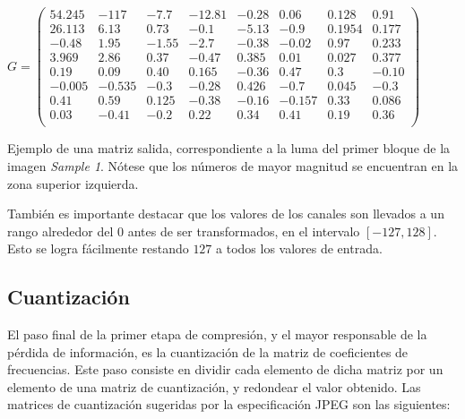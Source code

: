 \documentclass[%
	final,
	reprint,
	notitlepage,
	narroweqnarray,
	inline,
	twoside,
	invited
	]{ieee}
\begin{document}
\( G = 
\begin{pmatrix}

54.245 & -117 & -7.7 & -12.81 & -0.28 & 0.06 & 0.128 & 0.91 \\
26.113 & 6.13 & 0.73 & -0.1 & -5.13 & -0.9 & 0.1954 & 0.177 \\
-0.48 & 1.95 & -1.55 & -2.7 & -0.38 & -0.02 & 0.97 & 0.233 \\ 
3.969 & 2.86 & 0.37 & -0.47 & 0.385 & 0.01 & 0.027 & 0.377 \\ 
0.19 & 0.09 & 0.40 & 0.165 & -0.36 & 0.47 & 0.3 & -0.10 \\
-0.005 & -0.535 & -0.3 & -0.28 & 0.426 & -0.7 & 0.045 & -0.3 \\
0.41 & 0.59 & 0.125 & -0.38 & -0.16 & -0.157 & 0.33 & 0.086 \\
0.03 & -0.41 & -0.2 & 0.22 & 0.34 & 0.41 & 0.19 & 0.36 \\
\end{pmatrix}\)
\begin{center}
Ejemplo de una matriz salida, correspondiente a la luma del primer bloque de la imagen \textit{Sample 1}. Nótese 
que los números de mayor magnitud se encuentran en la zona superior izquierda.
\end{center}

\par También es importante destacar que los valores de los canales son llevados a un rango 
alrededor del $0$ antes de ser transformados, en el intervalo $[-127,128]$. Esto se logra fácilmente restando 
$127$ a todos los valores de entrada.

\subsection{Cuantización}

\par El paso final de la primer etapa de compresión, y el mayor responsable de la pérdida de información, es la cuantización 
de la matriz de coeficientes de frecuencias. Este paso consiste en dividir cada elemento de dicha matriz por un elemento de una  
matriz de cuantización, y redondear el valor obtenido. 
Las matrices de cuantización sugeridas por la especificación JPEG son las siguientes:
\end{document}
